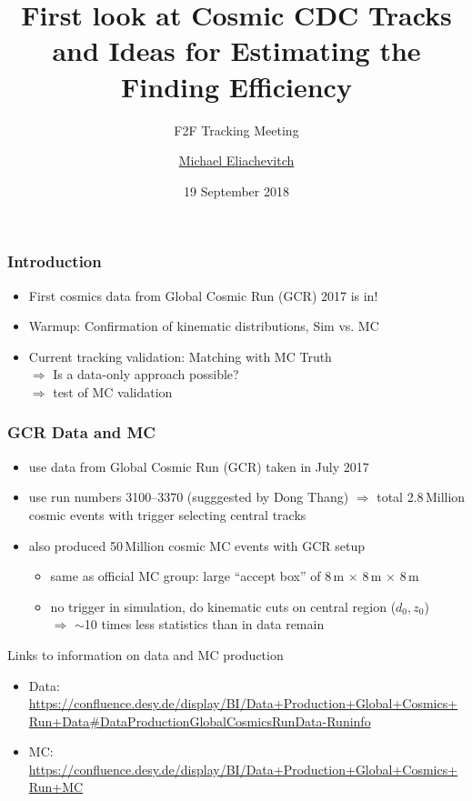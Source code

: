 \documentclass[18pt]{beamer}
\title{First look at Cosmic CDC Tracks and Ideas for Estimating the Finding Efficiency}
\subtitle{F2F Tracking Meeting}
\author{\underline{Michael Eliachevitch}}
\date{19 September 2018}
\institute{ETP - KIT}
\begin{document}

  \begin{frame}
  \titlepage
  \end{frame}

  \begin{frame}
    \frametitle{Introduction}
    \begin{itemize}
    \item First cosmics data from Global Cosmic Run (GCR) 2017 is in!
    \item Warmup: Confirmation of kinematic distributions, Sim vs. MC
    \item Current tracking validation: Matching with MC Truth\\
      $\Rightarrow$ Is a data-only approach possible?\\
      $\Rightarrow$ test of MC validation


    \end{itemize}
  \end{frame}

  \begin{frame}
    \frametitle{GCR Data and MC}
    \begin{itemize}
    \item use data from Global Cosmic Run (GCR) taken in July 2017
    \item use run numbers 3100--3370 (sugggested by Dong Thang)
      $\Rightarrow$ total 2.8\,Million cosmic events with trigger selecting central tracks\\
    \item also produced 50\,Million cosmic MC events with GCR setup
      \begin{itemize}
      \item same as official MC group: large ``accept box'' of 8\,m $\times$ 8\,m $\times$ 8\,m 
      \item no trigger in simulation, do kinematic cuts on central region ($d_0, z_0$)\\
        $\Rightarrow$  $\sim$10 times less statistics than in data remain
      \end{itemize}
    \end{itemize}

    \begin{block}{Links to information on data and MC production}
      \begin{itemize}
      \item Data: \footnotesize{\url{https://confluence.desy.de/display/BI/Data+Production+Global+Cosmics+Run+Data\#DataProductionGlobalCosmicsRunData-Runinfo}}
      \item MC: \footnotesize{\url{https://confluence.desy.de/display/BI/Data+Production+Global+Cosmics+Run+MC}}
      \end{itemize}
    \end{block}
  \end{frame}
\end{document}
